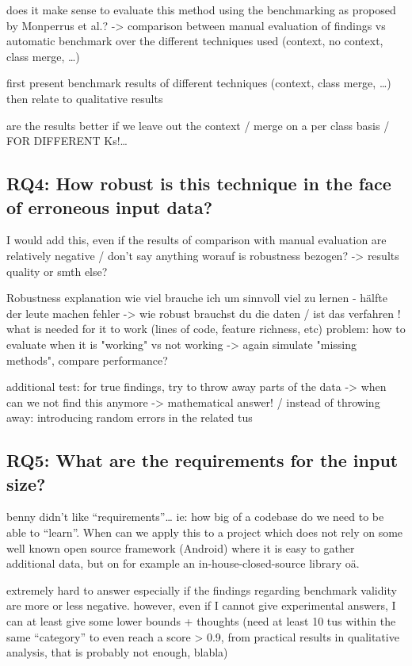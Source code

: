 does it make sense to evaluate this method using the benchmarking as proposed by Monperrus et al.?
-> comparison between manual evaluation of findings vs automatic benchmark over the different techniques used (context, no context, class merge, \ldots)

first present benchmark results of different techniques (context, class merge, \ldots) then relate to qualitative results

are the results better if we leave out the context / merge on a per class basis / FOR DIFFERENT Ks!\ldots

\subsection{RQ4: How robust is this technique in the face of erroneous input data?}
I would add this, even if the results of comparison with manual evaluation are relatively negative / don't say anything
worauf is robustness bezogen? -> results quality or smth else?

Robustness explanation
    wie viel brauche ich um sinnvoll viel zu lernen - hälfte der leute machen fehler -> wie robust brauchst du die daten / ist das verfahren !
    what is needed for it to work (lines of code, feature richness, etc) 
    problem: how to evaluate when it is "working" vs not working -> again simulate "missing methods", compare performance?

additional test:
	for true findings, try to throw away parts of the data -> when can we not find this anymore -> mathematical answer!
    / instead of throwing away: introducing random errors in the related tus

\subsection{RQ5: What are the requirements for the input size?}
benny didn't like ``requirements''\ldots
ie: how big of a codebase do we need to be able to ``learn''. When can we apply this to a project which does not rely on some well known open source framework (Android) where it is easy to gather additional data, but on for example an in-house-closed-source library oä.

extremely hard to answer especially if the findings regarding benchmark validity are more or less negative.
however, even if I cannot give experimental answers, I can at least give some lower bounds + thoughts
(need at least 10 tus within the same ``category'' to even reach a score > 0.9, from practical results in qualitative analysis, that is probably not enough, blabla)

